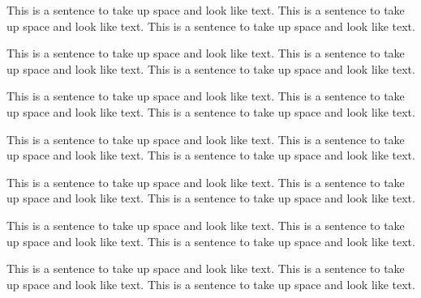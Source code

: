  
 
This is a sentence to take up space and look like text.
This is a sentence to take up space and look like text.
This is a sentence to take up space and look like text.
 
This is a sentence to take up space and look like text.
This is a sentence to take up space and look like text.
This is a sentence to take up space and look like text.
 
This is a sentence to take up space and look like text.
This is a sentence to take up space and look like text.
This is a sentence to take up space and look like text.
 
This is a sentence to take up space and look like text.
This is a sentence to take up space and look like text.
This is a sentence to take up space and look like text.
 
This is a sentence to take up space and look like text.
This is a sentence to take up space and look like text.
This is a sentence to take up space and look like text.
 
This is a sentence to take up space and look like text.
This is a sentence to take up space and look like text.
This is a sentence to take up space and look like text.
 
This is a sentence to take up space and look like text.
This is a sentence to take up space and look like text.
This is a sentence to take up space and look like text.
